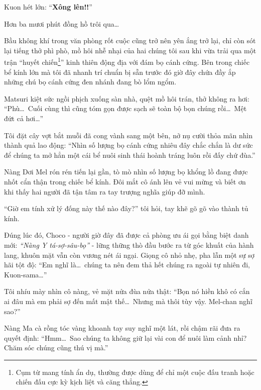 \documentclass[../main.tex]{subfiles}
\begin{document}
Kuon hét lớn:
``\textbf{Xông lên!!}''


\omk


Hơn ba mươi phút đồng hồ trôi qua\dots\

Bầu không khí trong văn phòng rốt cuộc cũng trở nên yên ắng trở lại, chỉ còn sót lại tiếng thở phì phò, mồ hôi nhễ nhại của hai chúng tôi sau khi vừa trải qua một trận ``huyết chiến\footnote{Cụm từ mang tính ẩn dụ, thường được dùng để chỉ một cuộc đấu tranh hoặc chiến đấu cực kỳ kịch liệt và căng thẳng.}'' kinh thiên động địa với đám bọ cánh cứng. Bên trong chiếc bể kính lớn mà tôi đã nhanh trí chuẩn bị sẵn trước đó giờ đây chứa đầy ắp những chú bọ cánh cứng đen nhánh đang bò lổm ngổm.


Matsuri kiệt sức ngồi phịch xuống sàn nhà, quệt mồ hôi trán, thở không ra hơi:
``Phù\dots\ Cuối cùng thì cũng tóm gọn được sạch sẽ toàn bộ bọn chúng rồi\dots\ Mệt đứt cả hơi\dots''

Tôi đặt cây vợt bắt muỗi đã cong vành sang một bên, nở nụ cười thỏa mãn nhìn thành quả lao động:
``Nhìn số lượng bọ cánh cứng nhiêu đây chắc chắn là dư sức để chúng ta mở hẳn một cái bể nuôi sinh thái hoành tráng luôn rồi đấy chứ đùa.''

Nàng Dơi Mel rón rén tiến lại gần, tò mò nhìn số lượng bọ khổng lồ đang được nhốt cẩn thận trong chiếc bể kính. Đôi mắt cô ánh lên vẻ vui mừng và biết ơn khi thấy hai người đã tận tâm ra tay trượng nghĩa giúp đỡ mình.

``Giờ em tính xử lý đống này thế nào đây?'' tôi hỏi, tay khẽ gõ gõ vào thành tủ kính.

Đúng lúc đó, Choco - người giờ đây đã được cả phòng ưu ái gọi bằng biệt danh mới: \emph{``Nàng Y tá-sợ-sâu-bọ''} - lững thững thò đầu bước ra từ góc khuất của hành lang, khuôn mặt vẫn còn vương nét ái ngại. Giọng cô nhỏ nhẹ, pha lẫn một sự sợ hãi tột độ:
``Em nghĩ là\dots\ chúng ta nên đem thả hết chúng ra ngoài tự nhiên đi, Kuon-sama\dots''

Tôi nhíu mày nhìn cô nàng, vẻ mặt nửa đùa nửa thật:
``Bọn nó hiền khô có cắn ai đâu mà em phải sợ đến mất mật thế\dots\ Nhưng mà thôi tùy vậy. Mel-chan nghĩ sao?''

Nàng Ma cà rồng tóc vàng khoanh tay suy nghĩ một lát, rồi chậm rãi đưa ra quyết định:
``Hmm\dots\ Sao chúng ta không giữ lại vài con để nuôi làm cảnh nhỉ? Chăm sóc chúng cũng thú vị mà.''
\end{document}
